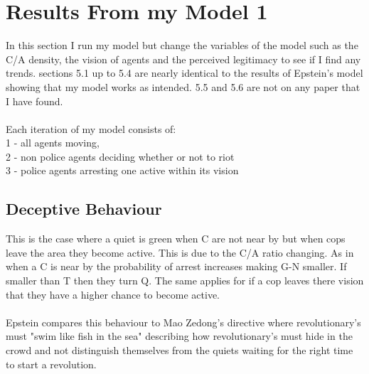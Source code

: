 \documentclass[11pt]{article}
\begin{document}
	
	\newpage
	\section{Results From my Model 1}
	In this section I run my model but change the variables of the model such as the C/A density, the vision of agents and the perceived legitimacy to see if I find any trends. sections 5.1 up to 5.4 are nearly identical to the results of Epstein's model showing that my model works as intended. 5.5 and 5.6 are not on any paper that I have found.\\
	\\
	Each iteration of my model consists of:\\
	1 - all agents moving, \\
	2 - non police agents deciding whether or not to riot\\
	3 - police agents arresting one active within its vision
	
	\subsection{Deceptive Behaviour}
	This is the case where a quiet is green when C are not near by but when cops leave the area they become active. This is due to the C/A ratio changing. As in when a C is near by the probability of arrest increases making G-N smaller. If smaller than T then they turn Q. The same applies for if a cop leaves there vision that they have a higher chance to become active.\\
	\\
	Epstein compares this behaviour to Mao Zedong's directive where revolutionary's must "swim like fish in the sea" describing how revolutionary's must hide in the crowd and not distinguish themselves from the quiets waiting for the right time to start a revolution.
	
\end{document}
